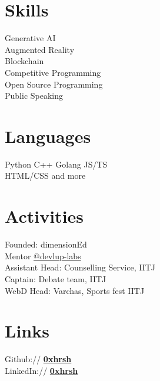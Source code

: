 \documentclass[]{deedy-resume-openfont}
\begin{document}
\begin{minipage}[t]{0.33\textwidth}
\sectionsep
\section{Skills}
\textbullet{} Generative AI \\
\textbullet{} Augmented Reality \\
\textbullet{} Blockchain \\
\textbullet{} Competitive Programming \\ 
\textbullet{} Open Source Programming \\
\textbullet{} Public Speaking

\sectionsep
\section{Languages}
\textbullet{} Python \textbullet{} C++ \textbullet{} Golang \textbullet{} JS/TS
\\\textbullet{} HTML/CSS \textbullet{} and more


\sectionsep
\section{Activities} 
\textbullet{} Founded: dimensionEd \\
\textbullet{} Mentor \href{https://github.com/devlup-labs}{@devlup-labs \faExternalLink} \\
\textbullet{} Assistant Head: Counselling Service, IITJ\\
\textbullet{} Captain: Debate team, IITJ\\
\textbullet{} WebD Head: Varchas, Sports fest IITJ

\sectionsep
\section{Links} 
Github:// \href{https://github.com/0xhrsh}{\bf 0xhrsh \faExternalLink} \\
LinkedIn://  \href{https://www.linkedin.com/in/0xhrsh/}{\bf 0xhrsh \faExternalLink} \\



%
%

\end{minipage} 
\hfill
\end{document}
